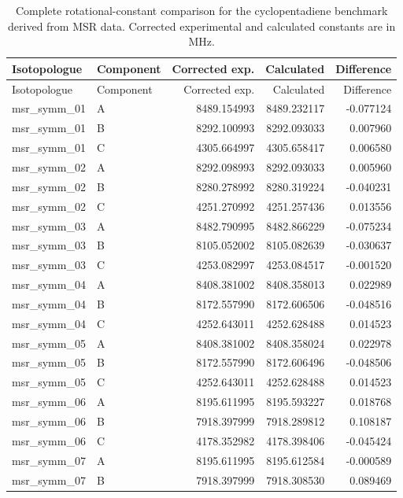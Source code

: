 \documentclass[12pt]{article}
\begin{document}
\begin{longtable}{llrrr}
\caption{Complete rotational-constant comparison for the cyclopentadiene benchmark derived from MSR data. Corrected experimental and calculated constants are in MHz.}\label{tab:si-cyclopentadiene-rotconstants}\\
\toprule
Isotopologue & Component & Corrected exp. & Calculated & Difference \\
\midrule
\endfirsthead
\toprule
Isotopologue & Component & Corrected exp. & Calculated & Difference \\
\midrule
\endhead
msr\_symm\_01 & A & 8489.154993 & 8489.232117 & -0.077124 \\
msr\_symm\_01 & B & 8292.100993 & 8292.093033 & 0.007960 \\
msr\_symm\_01 & C & 4305.664997 & 4305.658417 & 0.006580 \\
msr\_symm\_02 & A & 8292.098993 & 8292.093033 & 0.005960 \\
msr\_symm\_02 & B & 8280.278992 & 8280.319224 & -0.040231 \\
msr\_symm\_02 & C & 4251.270992 & 4251.257436 & 0.013556 \\
msr\_symm\_03 & A & 8482.790995 & 8482.866229 & -0.075234 \\
msr\_symm\_03 & B & 8105.052002 & 8105.082639 & -0.030637 \\
msr\_symm\_03 & C & 4253.082997 & 4253.084517 & -0.001520 \\
msr\_symm\_04 & A & 8408.381002 & 8408.358013 & 0.022989 \\
msr\_symm\_04 & B & 8172.557990 & 8172.606506 & -0.048516 \\
msr\_symm\_04 & C & 4252.643011 & 4252.628488 & 0.014523 \\
msr\_symm\_05 & A & 8408.381002 & 8408.358024 & 0.022978 \\
msr\_symm\_05 & B & 8172.557990 & 8172.606496 & -0.048506 \\
msr\_symm\_05 & C & 4252.643011 & 4252.628488 & 0.014523 \\
msr\_symm\_06 & A & 8195.611995 & 8195.593227 & 0.018768 \\
msr\_symm\_06 & B & 7918.397999 & 7918.289812 & 0.108187 \\
msr\_symm\_06 & C & 4178.352982 & 4178.398406 & -0.045424 \\
msr\_symm\_07 & A & 8195.611995 & 8195.612584 & -0.000589 \\
msr\_symm\_07 & B & 7918.397999 & 7918.308530 & 0.089469 \\

\end{longtable}
\end{document}
